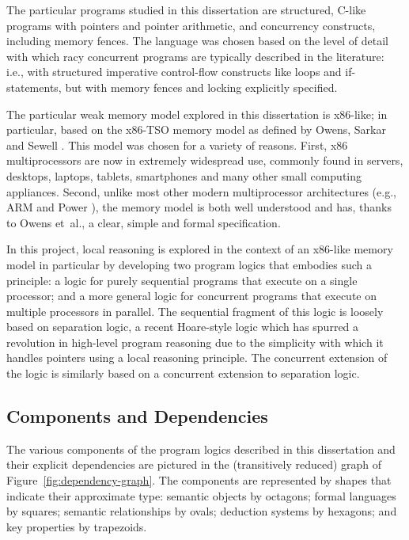 \documentclass[11pt]{report}
\begin{document}
The particular programs studied in this dissertation are structured, C-like programs with pointers and pointer arithmetic, and concurrency constructs, including memory fences. The language was chosen based on the level of detail with which racy concurrent programs are typically described in the literature: i.e., with structured imperative control-flow constructs like loops and if-statements, but with memory fences and locking explicitly specified. 

The particular weak memory model explored in this dissertation is x86-like; in particular, based on the x86-TSO memory model as defined by Owens, Sarkar and Sewell \cite{DBLP:conf/tphol/OwensSS09}. This model was chosen for a variety of reasons. First, x86 multiprocessors are now in extremely widespread use, commonly found in servers, desktops, laptops, tablets, smartphones and many other small computing appliances. Second, unlike most other modern multiprocessor architectures (e.g., ARM and Power \cite{DBLP:conf/popl/AlglaveFIMSSN09,DBLP:conf/pldi/SarkarSAMW11}), the memory model is both well understood and has, thanks to Owens et~al., a clear, simple and formal specification. 

In this project, local reasoning is explored in the context of an x86-like memory model in particular by developing two program logics that embodies such a principle: a logic for purely sequential programs that execute on a single processor; and a more general logic for concurrent programs that execute on multiple processors in parallel. The sequential fragment of this logic is loosely based on separation logic, a recent Hoare-style logic which has spurred a revolution in high-level program reasoning due to the simplicity with which it handles pointers using a local reasoning principle. The concurrent extension of the logic is similarly based on a concurrent extension to separation logic. 

\subsection{Components and Dependencies}

The various components of the program logics described in this dissertation and their explicit dependencies are pictured in the (transitively reduced) graph of Figure~\ref{fig:dependency-graph}. The components are represented by shapes that indicate their approximate type: semantic objects by octagons; formal languages by squares; semantic relationships by ovals; deduction systems by hexagons; and key properties by trapezoids. 
\end{document}
